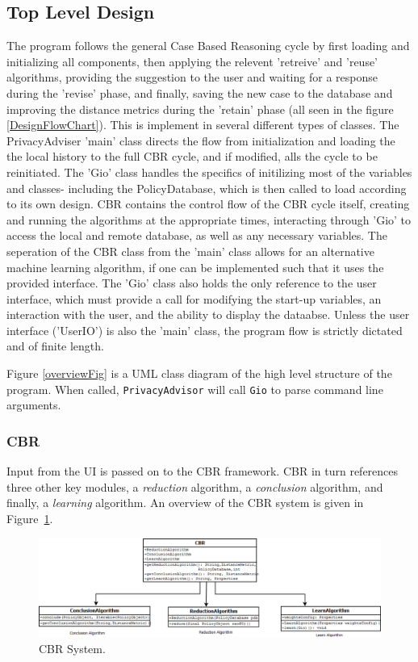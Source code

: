 \subsection{Top Level Design}
The program follows the general Case Based Reasoning cycle by first loading and initializing all components, then applying the relevent 'retreive' and 'reuse' algorithms, providing the suggestion to the user and waiting for a response during the 'revise' phase, and finally, saving the new case to the database and improving the distance metrics during the 'retain' phase (all seen in the figure \ref{DesignFlowChart}).
This is implement in several different types of classes. The PrivacyAdviser 'main' class directs the flow from initialization and loading the the local history to the full CBR cycle, and if modified, alls the cycle to be reinitiated. The 'Gio' class handles the specifics of initilizing most of the variables and classes- including the PolicyDatabase, which is then called to load according to its own design. CBR contains the control flow of the CBR cycle itself, creating and running the algorithms at the appropriate times, interacting through 'Gio' to access the local and remote database, as well as any necessary variables. The seperation of the CBR class from the 'main' class allows for an alternative machine learning algorithm, if one can be implemented such that it uses the provided interface. The 'Gio' class also holds the only reference to the user interface, which must provide a call for modifying the start-up variables, an interaction with the user, and the ability to display the dataabse. Unless the user interface ('UserIO') is also the 'main' class, the program flow is strictly dictated and of finite length.

Figure \ref{overviewFig} is a UML class diagram of the high level structure of the program. When called, \texttt{PrivacyAdvisor} will call \texttt{Gio} to parse command line arguments. 


\subsubsection{CBR} 
Input from the UI is passed on to the CBR framework. CBR in turn references three other key modules, a \emph{reduction} algorithm, a \emph{conclusion} algorithm, and finally, a \emph{learning} algorithm. An overview of the CBR system is given in Figure~\ref{cbr_fig}.

\begin{figure}[h!]
\begin{center}
\includegraphics[width = \textwidth]{DesignReport/uml/CBR.png}
\caption{CBR System.}
\label{cbr_fig}
\end{center}
\end{figure}

